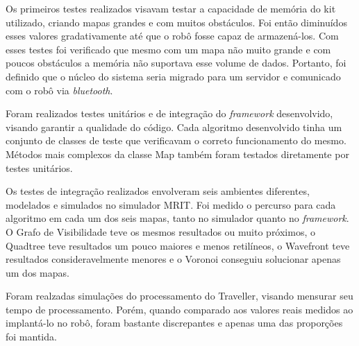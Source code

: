 Os primeiros testes realizados visavam testar a capacidade  de memória do kit utilizado, criando mapas grandes e com muitos obstáculos. Foi então diminuídos esses valores gradativamente até que o robô fosse capaz de armazená-los. Com esses testes foi verificado que mesmo com um mapa não muito grande e com poucos obstáculos a memória não suportava esse volume de dados. Portanto, foi definido que o núcleo do sistema seria migrado para um servidor e comunicado com o robô via \textit{bluetooth}.

Foram realizados testes unitários e de integração do \textit{framework} desenvolvido, visando garantir a qualidade do código. Cada algoritmo desenvolvido tinha um conjunto de classes de teste que verificavam o correto funcionamento do mesmo. Métodos mais complexos da classe Map também foram testados diretamente por testes unitários.

Os testes de integração realizados envolveram seis ambientes diferentes, modelados e simulados no simulador MRIT. Foi medido o percurso para cada algoritmo em cada um dos seis mapas, tanto no simulador quanto no \textit{framework}. O Grafo de Visibilidade teve os mesmos resultados ou muito próximos, o Quadtree teve resultados um pouco maiores e menos retilíneos, o Wavefront teve resultados consideravelmente menores e o Voronoi conseguiu solucionar apenas um dos mapas.

Foram realzadas simulações do processamento do Traveller, visando mensurar seu tempo de processamento. Porém, quando comparado aos valores reais medidos ao implantá-lo no robô, foram bastante discrepantes e apenas uma das proporções foi mantida.